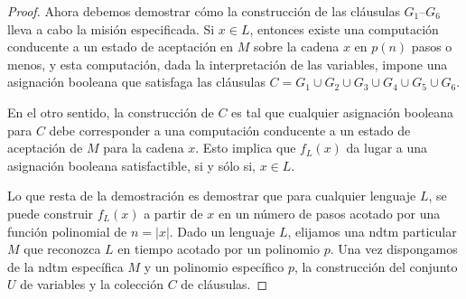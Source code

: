 \documentclass[11pt, a4paper]{memoir}
\begin{document}
\begin{proof}
Ahora debemos demostrar cómo la construcción de las cláusulas $G_1$--$G_6$ lleva a cabo la misión especificada. Si $x\in L$, entonces existe una computación conducente a un estado de aceptación en $M$ sobre la cadena $x$ en $p(n)$ pasos o menos, y esta computación, dada la interpretación de las variables, impone una asignación booleana que satisfaga las cláusulas $C=G_1 \cup G_2 \cup G_3 \cup G_4 \cup G_5 \cup G_6$. 

En el otro sentido, la construcción de $C$ es tal que cualquier asignación booleana para $C$ debe corresponder a una computación conducente a un estado de aceptación de $M$ para la cadena $x$. Esto implica que $f_L(x)$ da lugar a una asignación booleana satisfactible, si y sólo si, $x\in L$.

Lo que resta de la demostración es demostrar que para cualquier lenguaje $L$, se puede construir $f_L(x)$ a partir de $x$ en un número de pasos acotado por una función polinomial de $n=|x|$. Dado un lenguaje $L$, elijamos una \gls{ndtm} particular $M$ que reconozca $L$ en tiempo acotado por un polinomio $p$. Una vez dispongamos de la \gls{ndtm} específica $M$ y un polinomio específico $p$, la construcción del conjunto $U$ de variables y la colección $C$ de cláusulas. 

\end{proof}

\clearpage
\printglossary[type=\acronymtype]
\end{document}
